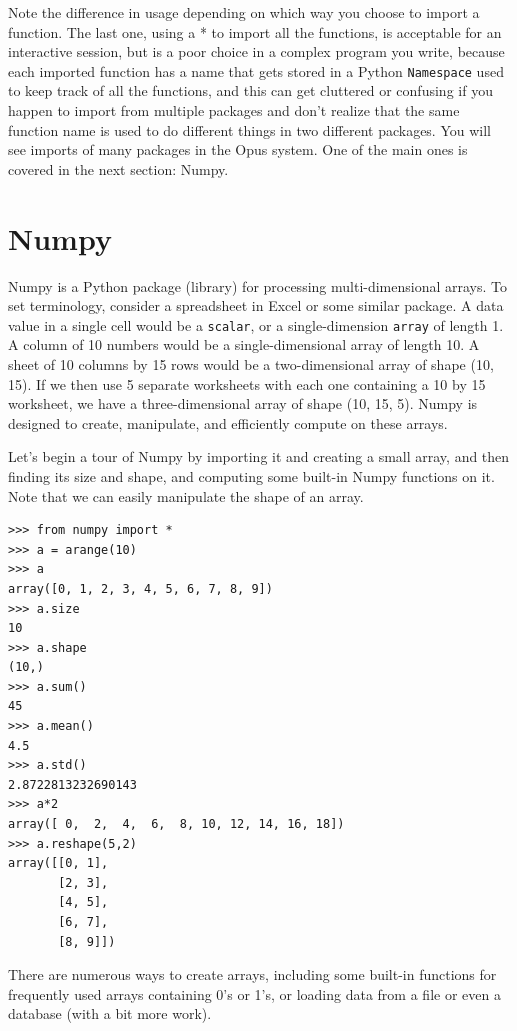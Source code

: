 Note the difference in usage depending on which way you choose to import a function.  The last one, using a * to import all the functions, is acceptable for an interactive session, but is a poor choice in a complex program you write, because each imported function has a name that gets stored in a Python \verb#Namespace# used to keep track of all the functions, and this can get cluttered or confusing if you happen to import from multiple packages and don't realize that the same function name is used to do different things in two different packages. You will see imports of many packages in the Opus system.  One of the main ones is covered in the next section: Numpy.


\section{Numpy}
\label{appendix:numpy}

Numpy is a Python package (library) for processing multi-dimensional arrays.  To set terminology, consider a spreadsheet in Excel or some similar package.  A data value in a single cell would be a \verb#scalar#, or a single-dimension \verb#array# of length 1.  A column of 10 numbers would be a single-dimensional array of length 10.  A sheet of 10 columns by 15 rows would be a two-dimensional array of shape (10, 15).  If we then use 5 separate worksheets with each one containing a 10 by 15 worksheet, we have a three-dimensional array of shape (10, 15, 5).  Numpy is designed to create, manipulate, and efficiently compute on these arrays.

Let's begin a tour of Numpy by importing it and creating a small array,  and then finding its size and shape, and computing some built-in Numpy functions on it. Note that we can easily manipulate the shape of an array.

\begin{verbatim}
>>> from numpy import *
>>> a = arange(10)
>>> a
array([0, 1, 2, 3, 4, 5, 6, 7, 8, 9])
>>> a.size
10
>>> a.shape
(10,)
>>> a.sum()
45
>>> a.mean()
4.5
>>> a.std()
2.8722813232690143
>>> a*2
array([ 0,  2,  4,  6,  8, 10, 12, 14, 16, 18])
>>> a.reshape(5,2)
array([[0, 1],
       [2, 3],
       [4, 5],
       [6, 7],
       [8, 9]])
\end{verbatim}

There are numerous ways to create arrays, including some built-in functions for frequently used arrays containing 0's or 1's, or loading data from a file or even a database (with a bit more work).

